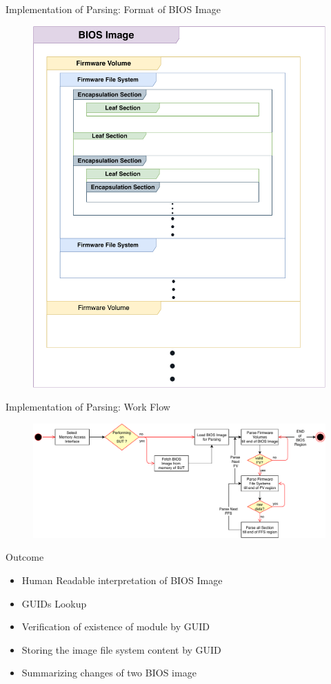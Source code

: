 \begin{frame}{Implementation of Parsing: Format of BIOS Image}
  \begin{figure}[htbp]
    \centering
    \includegraphics[width=0.5\linewidth]{Im/figures/bios-as-filesystem}
  \end{figure}
\end{frame}

\begin{frame}{Implementation of Parsing: Work Flow}
  \begin{figure}[htbp]
    \centering
    \includegraphics[width=\linewidth]{Im/figures/uefi-parser}
  \end{figure}
\end{frame}

\begin{frame}{Outcome}
  \begin{itemize}
    \item Human Readable interpretation of BIOS Image
    \item GUIDs Lookup
    \item Verification of existence of module by GUID
    \item Storing the image file system content by GUID
    \item Summarizing changes of two BIOS image
  \end{itemize}
\end{frame}


